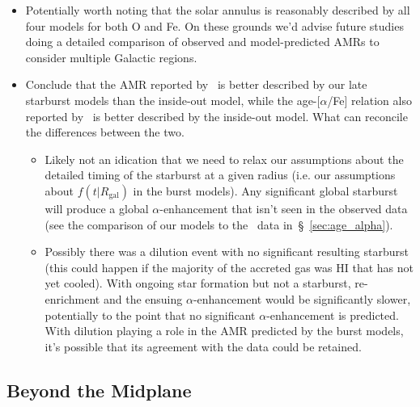 \documentclass[a4paper, fleqn, usenatbib, useAMS]{mnras}
\begin{document}
\begin{itemize}
	\item Potentially worth noting that the solar annulus is reasonably 
	described by all four models for both O and Fe. On these grounds we'd 
	advise future studies doing a detailed comparison of observed and 
	model-predicted AMRs to consider multiple Galactic regions. 

	\item Conclude that the AMR reported by~\citet{Feuillet2019} is better 
	described by our late starburst models than the inside-out model, while 
	the age-[$\alpha$/Fe] relation also reported by~\citet{Feuillet2019} is 
	better described by the inside-out model. What can reconcile the 
	differences between the two. 
	\begin{itemize} 
		\item Likely not an idication that we need to relax our assumptions 
		about the detailed timing of the starburst at a given radius (i.e. 
		our assumptions about $f(t|R_\text{gal})$ in the burst models). Any 
		significant global starburst will produce a global $\alpha$-enhancement 
		that isn't seen in the observed data (see the comparison of our 
		models to the~\citet{Feuillet2019} data in~\S~\ref{sec:age_alpha}). 

		\item Possibly there was a dilution event with no significant 
		resulting starburst (this could happen if the majority of the accreted 
		gas was HI that has not yet cooled). With ongoing star formation but 
		not a starburst, re-enrichment and the ensuing $\alpha$-enhancement 
		would be significantly slower, potentially to the point that no 
		significant $\alpha$-enhancement is predicted. With dilution playing 
		a role in the AMR predicted by the burst models, it's possible that 
		its agreement with the data could be retained. 
	\end{itemize} 
\end{itemize} 

\subsection{Beyond the Midplane} 
\label{sec:amr:beyond_midplane} 
\end{document}
